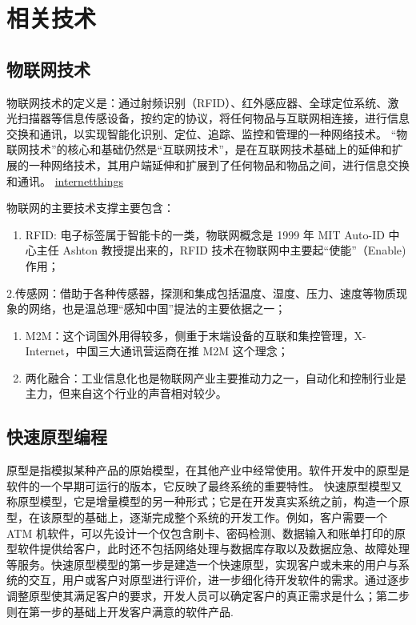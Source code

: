 \documentclass[doctor,secret]{thuthesis}
\begin{document}
\chapter{相关技术}
\label{sec:orgb6343b8}
\section{物联网技术}
\label{sec:org96d2e9a}
物联网技术的定义是：通过射频识别（RFID）、红外感应器、全球定位系统、激光扫描器等信息传感设备，按约定的协议，将任何物品与互联网相连接，进行信息交换和通讯，以实现智能化识别、定位、追踪、监控和管理的一种网络技术。
“物联网技术”的核心和基础仍然是“互联网技术”，是在互联网技术基础上的延伸和扩展的一种网络技术，其用户端延伸和扩展到了任何物品和物品之间，进行信息交换和通讯。
\href{figures/internetofthings.pdf}{internetthings}

物联网的主要技术支撑主要包含：
\begin{enumerate}
\item RFID: 电子标签属于智能卡的一类，物联网概念是 1999 年 MIT Auto-ID 中心主任 Ashton 教授提出来的，RFID 技术在物联网中主要起“使能”（Enable)作用；
\end{enumerate}
2.传感网：借助于各种传感器，探测和集成包括温度、湿度、压力、速度等物质现象的网络，也是温总理“感知中国”提法的主要依据之一；
\begin{enumerate}
\item M2M：这个词国外用得较多，侧重于末端设备的互联和集控管理，X-Internet，中国三大通讯营运商在推 M2M 这个理念；
\item 两化融合：工业信息化也是物联网产业主要推动力之一，自动化和控制行业是主力，但来自这个行业的声音相对较少。
\end{enumerate}
\section{快速原型编程}
\label{sec:orgd1e455e}
原型是指模拟某种产品的原始模型，在其他产业中经常使用。软件开发中的原型是软件的一个早期可运行的版本，它反映了最终系统的重要特性。
快速原型模型又称原型模型，它是增量模型的另一种形式；它是在开发真实系统之前，构造一个原型，在该原型的基础上，逐渐完成整个系统的开发工作。例如，客户需要一个 ATM 机软件，可以先设计一个仅包含刷卡、密码检测、数据输入和账单打印的原型软件提供给客户，此时还不包括网络处理与数据库存取以及数据应急、故障处理等服务。快速原型模型的第一步是建造一个快速原型，实现客户或未来的用户与系统的交互，用户或客户对原型进行评价，进一步细化待开发软件的需求。通过逐步调整原型使其满足客户的要求，开发人员可以确定客户的真正需求是什么；第二步则在第一步的基础上开发客户满意的软件产品.
\end{document}
